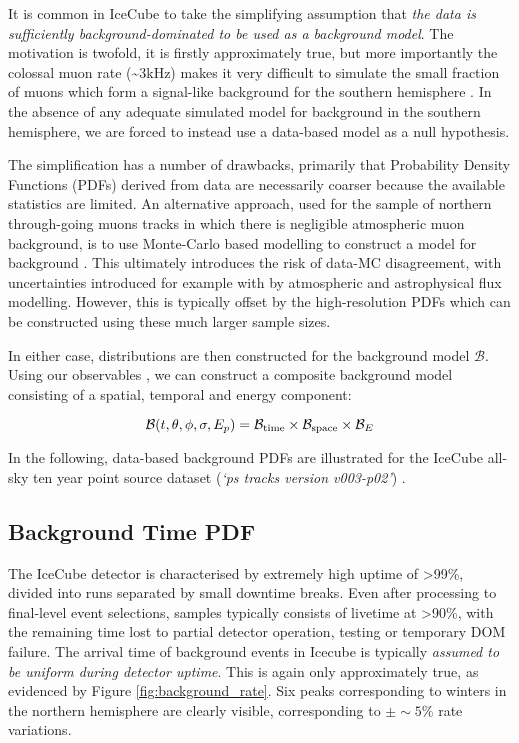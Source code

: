 It is common in IceCube to take the simplifying assumption that \emph{the data is sufficiently background-dominated to be used as a background model}. The motivation is twofold, it is firstly approximately true, but more importantly the colossal muon rate (\sim3kHz) makes it very difficult to simulate the small fraction of muons which form a signal-like background for the southern hemisphere . In the absence of any adequate simulated model for background in the southern hemisphere, we are forced to instead use a data-based model as a null hypothesis. 

The simplification has a number of drawbacks, primarily that Probability Density Functions (PDFs) derived from data are necessarily coarser because the available statistics are limited. An alternative approach, used for the sample of northern through-going muons tracks in which there is negligible atmospheric muon background, is to use Monte-Carlo based modelling to construct a model for background . This ultimately introduces the risk of data-MC disagreement,  with uncertainties introduced for example with by atmospheric and astrophysical flux modelling. However, this is typically offset by the high-resolution PDFs which can be constructed using these much larger sample sizes.

In either case, distributions are then constructed for the background model $\mathcal{B}$. Using our observables , we can construct a composite background model consisting of a spatial, temporal and energy component:

\begin{equation}
\mathcal{B} (t, \theta, \phi, \sigma, E_{p}) =  \mathcal{B}_{\textup{time}} \times  \mathcal{B}_{\textup{space}} \times\mathcal{B}_{E}
\end{equation}

In the following, data-based background PDFs are illustrated for the IceCube all-sky ten year point source dataset (\emph{`ps tracks version v003-p02'}) .

\subsection*{Background Time PDF}

The IceCube detector is characterised by extremely high uptime of >99\%, divided into runs separated by small downtime breaks. Even after processing to final-level event selections, samples typically consists of livetime at >90\%, with the remaining time lost to partial detector operation, testing or temporary DOM failure. The arrival time of background events in Icecube is typically \emph{assumed to be uniform during detector uptime}. This is again only approximately true, as evidenced by Figure \ref{fig:background_rate}.  Six peaks corresponding to winters in the northern hemisphere are clearly visible, corresponding to $\pm \sim5\%$ rate variations.

